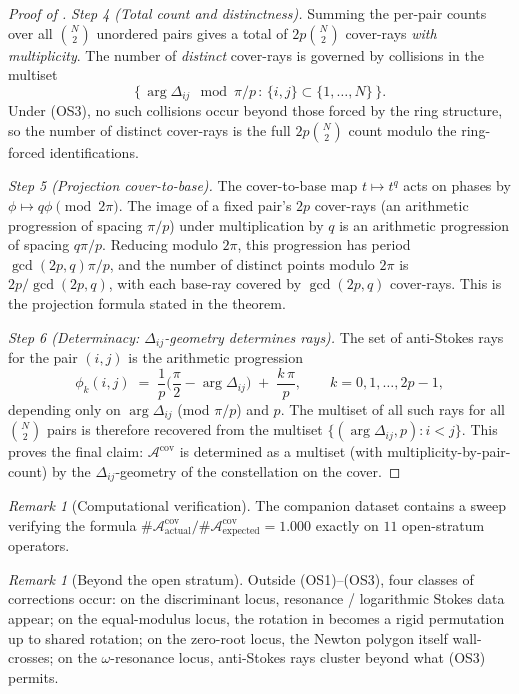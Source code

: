 \documentclass[11pt,a4paper]{article}
\theoremstyle{plain}
\theoremstyle{definition}
\theoremstyle{remark}
\newtheorem{remark}[theorem]{Remark}
\newcommand{\Acov}{\mathcal{A}^{\mathrm{cov}}}
\newcommand{\Dij}{\Delta_{ij}}
\DeclareMathOperator{\arginline}{arg}
\begin{document}
\begin{proof}[Proof of ]
\smallskip
\textit{Step 4 (Total count and distinctness).}
Summing the per-pair counts over all $\binom{N}{2}$ unordered pairs
gives a total of $2p \binom{N}{2}$ cover-rays \emph{with
multiplicity}. The number of \emph{distinct} cover-rays is governed
by collisions in the multiset
\[
   \big\{\,\arginline \Dij \mod \pi/p \,:\, \{i, j\} \subset
   \{1, \dots, N\}\,\big\}.
\]
Under (OS3), no such collisions occur beyond those forced by the
ring structure, so the number of distinct cover-rays is the full
$2p \binom{N}{2}$ count modulo the ring-forced identifications.

\smallskip
\textit{Step 5 (Projection cover-to-base).}
The cover-to-base map $t \mapsto t^q$ acts on phases by $\phi \mapsto
q\phi \pmod{2\pi}$. The image of a fixed pair's $2p$ cover-rays (an
arithmetic progression of spacing $\pi/p$) under multiplication by
$q$ is an arithmetic progression of spacing $q \pi / p$. Reducing
modulo $2\pi$, this progression has period $\gcd(2p, q) \pi / p$, and
the number of distinct points modulo $2\pi$ is
$2p / \gcd(2p, q)$, with each base-ray covered by $\gcd(2p, q)$
cover-rays. This is the projection formula stated in the theorem.

\smallskip
\textit{Step 6 (Determinacy: $\Dij$-geometry determines rays).}
The set of anti-Stokes rays for the pair $(i, j)$ is the arithmetic
progression
\[
   \phi_k(i, j) \;=\; \frac{1}{p}\Big(\frac{\pi}{2} - \arginline \Dij
   \Big) \;+\; \frac{k\, \pi}{p}, \qquad k = 0, 1, \dots, 2p - 1,
\]
depending only on $\arginline \Dij$ (mod $\pi/p$) and $p$. The
multiset of all such rays for all $\binom{N}{2}$ pairs is therefore
recovered from the multiset $\{(\arginline \Dij, p) : i < j\}$. This
proves the final claim: $\Acov$ is determined as a multiset (with
multiplicity-by-pair-count) by the $\Dij$-geometry of the
constellation on the cover.
\end{proof}

\begin{remark}[Computational verification]\label{rem:AT1-verif}
The companion dataset \cite{wkb_dataset_v1} contains a sweep verifying
the formula $\#\Acov_{\mathrm{actual}} / \#\Acov_{\mathrm{expected}}
= 1.000$ exactly on $11$ open-stratum operators.
\end{remark}

\begin{remark}[Beyond the open stratum]\label{rem:AT1-degenerate}
Outside (OS1)--(OS3), four classes of corrections occur:
on the discriminant locus, resonance / logarithmic Stokes data appear;
on the equal-modulus locus, the rotation in  becomes a
rigid permutation up to shared rotation; on the zero-root locus, the
Newton polygon itself wall-crosses; on the $\omega$-resonance locus,
anti-Stokes rays cluster beyond what (OS3) permits.
\end{remark}
\end{document}
